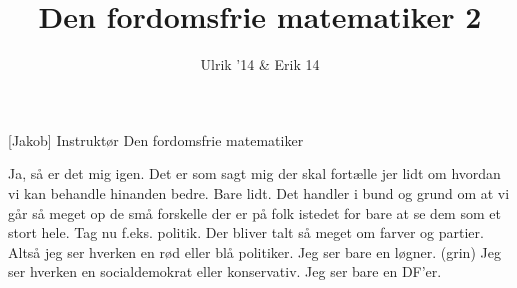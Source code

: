 \documentclass[a4paper,11pt]{article}
\title{Den fordomsfrie matematiker 2}
\author{Ulrik '14 \& Erik 14}
\begin{document}
\maketitle

\begin{roles}
[Jakob] Instruktør
 Den fordomsfrie matematiker
\end{roles}




\begin{sketch}


 Ja, så er det mig igen. Det er som sagt mig der skal fortælle jer lidt om hvordan vi kan behandle hinanden bedre. Bare lidt. Det handler i bund og grund om at vi går så meget op de små forskelle der er på folk istedet for bare at se dem som et stort hele. Tag nu f.eks. politik. Der bliver talt så meget om farver og partier. Altså jeg ser hverken en rød eller blå politiker. Jeg ser bare en løgner. (grin) Jeg ser hverken en socialdemokrat eller konservativ. Jeg ser bare en DF’er.



\end{sketch}
\end{document}

